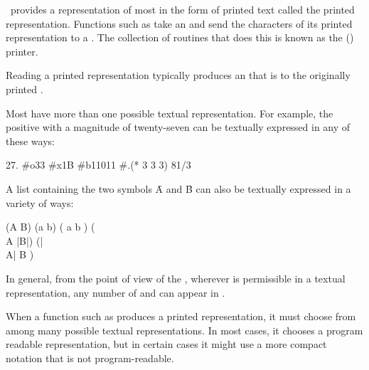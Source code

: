 

\clisp\ provides a representation of most  in the form 
of printed text called the printed representation.
Functions such as  take an  
and send the characters of its printed representation to a . 
The collection of routines that does this is known as the (\clisp) printer.  

Reading a printed representation 
typically
produces an  that is  to the
originally printed .


Most  have more than one possible textual representation.
For example, the positive  with a magnitude of twenty-seven
can be textually expressed in any of these ways:

    27.    #o33    #x1B    #b11011    #.(* 3 3 3)    81/3
\endcode

A list containing the two symbols \f{A} and \f{B} can also be textually
expressed in a variety of ways:

\code
 (A B)    (a b)    (  a  b )    (\\A |B|) 
(|\\A|
  B
)
\endcode

In general,
from the point of view of the ,
wherever  is permissible in a textual representation,
any number of  and  can appear in .

When a function such as  produces a printed representation,
it must choose 
from among many possible textual representations.
In most cases, it chooses a 
program readable representation,
but in certain cases it might use a more compact notation that is not 
program-readable.

